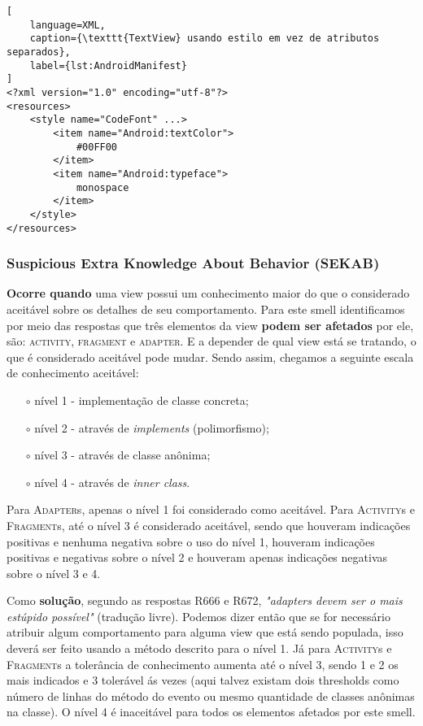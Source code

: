 \begin{lstlisting}[
	language=XML, 
	caption={\texttt{TextView} usando estilo em vez de atributos separados}, 
	label={lst:AndroidManifest}
]
<?xml version="1.0" encoding="utf-8"?>
<resources>
    <style name="CodeFont" ...>
        <item name="Android:textColor">
        	#00FF00
        </item>
        <item name="Android:typeface">
        	monospace
        </item>
    </style>
</resources>
\end{lstlisting}


\subsubsection{Suspicious Extra Knowledge About Behavior (SEKAB)}

\textbf{Ocorre quando} uma view possui um conhecimento maior do que o considerado aceit\'avel sobre os detalhes de seu comportamento. Para este smell identificamos por meio das respostas que tr\^es elementos da view \textbf{podem ser afetados} por ele, s\~ao: \textsc{activity}, \textsc{fragment} e \textsc{adapter}. E a depender de qual view est\'a se tratando, o que \'e considerado aceit\'avel pode mudar. Sendo assim, chegamos a seguinte escala de conhecimento aceit\'avel:

\begin{itemize} 
	\item[$\circ$] n\'ivel 1 - implementa\c{c}\~ao de classe concreta;
	\item[$\circ$] n\'ivel 2 - atrav\'es de \textit{implements} (polimorfismo);
	\item[$\circ$] n\'ivel 3 - atrav\'es de classe an\^onima;
	\item[$\circ$] n\'ivel 4 - atrav\'es de \textit{inner class}.
\end{itemize}

Para \textsc{Adapter}s, apenas o n\'ivel 1 foi considerado como aceit\'avel. Para \textsc{Activity}s e \textsc{Fragment}s, at\'e o n\'ivel 3 \'e considerado aceit\'avel, sendo que houveram indica\c{c}\~oes positivas e nenhuma negativa sobre o uso do n\'ivel 1, houveram indica\c{c}\~oes positivas e negativas sobre o n\'ivel 2 e houveram apenas indica\c{c}\~oes negativas sobre o n\'ivel 3 e 4. 

Como \textbf{solu\c{c}\~ao}, segundo as respostas R666 e R672, \textit{"adapters devem ser o mais est\'upido poss\'ivel"} (tradu\c{c}\~ao livre). Podemos dizer ent\~ao que se for necess\'ario atribuir algum comportamento para alguma view que est\'a sendo populada, isso dever\'a ser feito usando a m\'etodo descrito para o n\'ivel 1. J\'a para \textsc{Activity}s e \textsc{Fragment}s a toler\^ancia de conhecimento aumenta at\'e o n\'ivel 3, sendo 1 e 2 os mais indicados e 3 toler\'avel \'as vezes (aqui talvez existam dois thresholds como n\'umero de linhas do m\'etodo do evento ou mesmo quantidade de classes an\^onimas na classe). O n\'ivel 4 \'e inaceit\'avel para todos os elementos afetados por este smell.

